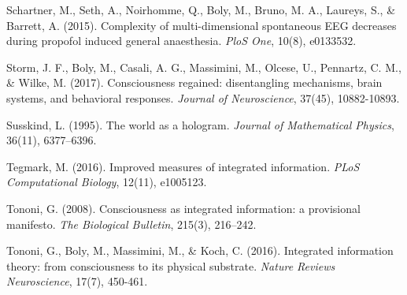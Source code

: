 \documentclass[12pt]{article}
\begin{document}
\begin{CJK}{UTF8}{gbsn}
\begin{thebibliography}{99}
     Schartner, M., Seth, A., Noirhomme, Q., Boly, M., Bruno, M. A., Laureys, S., \& Barrett, A. (2015). Complexity of multi-dimensional spontaneous EEG decreases during propofol induced general anaesthesia. \emph{PloS One}, 10(8), e0133532.
    
     Storm, J. F., Boly, M., Casali, A. G., Massimini, M., Olcese, U., Pennartz, C. M., \& Wilke, M. (2017). Consciousness regained: disentangling mechanisms, brain systems, and behavioral responses. \emph{Journal of Neuroscience}, 37(45), 10882-10893.
    
     Susskind, L. (1995). The world as a hologram. \emph{Journal of Mathematical Physics}, 36(11), 6377–6396.
    
     Tegmark, M. (2016). Improved measures of integrated information. \emph{PLoS Computational Biology}, 12(11), e1005123.
    
     Tononi, G. (2008). Consciousness as integrated information: a provisional manifesto. \emph{The Biological Bulletin}, 215(3), 216–242.
    
     Tononi, G., Boly, M., Massimini, M., \& Koch, C. (2016). Integrated information theory: from consciousness to its physical substrate. \emph{Nature Reviews Neuroscience}, 17(7), 450-461.
\end{thebibliography}

\end{CJK}
\end{document}
